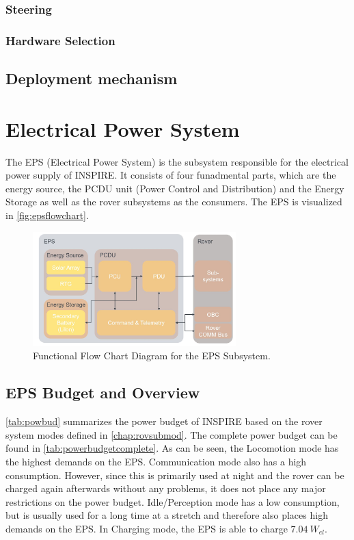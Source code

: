 \subsubsection*{Steering}
\label{sec:Steering}



\subsubsection*{Hardware Selection}
\label{sec:HardwareLoco}



\subsection{Deployment mechanism}

\section{Electrical Power System}
\label{sec:EPS}
The EPS (Electrical Power System) is the subsystem responsible for the electrical power supply of INSPIRE. It consists of four funadmental parts, which are the energy source, the PCDU unit (Power Control and Distribution) and the Energy Storage as well as the rover subsystems as the consumers. The EPS is visualized in \autoref{fig:epsflowchart}.

\begin{figure}[htb]
{\centering
\includegraphics[width=0.7\textwidth]{Media/epsflowchart}
\caption{Functional Flow Chart Diagram for the EPS Subsystem.}
\label{fig:epsflowchart}
}
\end{figure}


\subsection{EPS Budget and Overview}
\autoref{tab:powbud} summarizes the power budget of INSPIRE based on the rover system modes defined in \autoref{chap:rovsubmod}. The complete power budget can be found in \autoref{tab:powerbudgetcomplete}.
As can be seen, the Locomotion mode has the highest demands on the EPS. Communication mode also has a high consumption. However, since this is primarily used at night and the rover can be charged again afterwards without any problems, it does not place any major restrictions on the power budget. Idle/Perception mode has a low consumption, but is usually used for a long time at a stretch and therefore also places high demands on the EPS. In Charging mode, the EPS is able to charge $7.04 \ W_{el} $.


